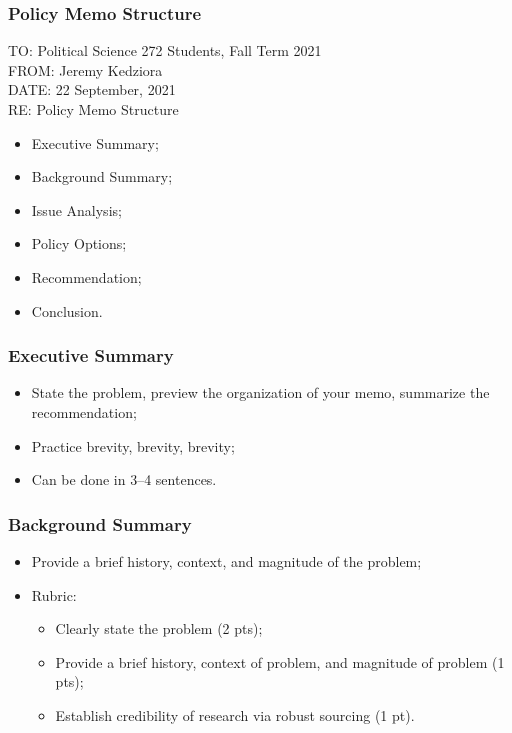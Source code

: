 \documentclass[aspectratio=169]{beamer}
\theoremstyle{principle}
\begin{document}
\begin{frame}
\frametitle{Policy Memo Structure}

TO: Political Science 272 Students, Fall Term 2021\\
FROM: Jeremy Kedziora\\
DATE: 22 September, 2021\\
RE: Policy Memo Structure\\
\begin{itemize}

\item Executive Summary;
\bigskip
\item Background Summary;
\bigskip
\item Issue Analysis;
\bigskip
\item Policy Options;
\bigskip
\item Recommendation;
\bigskip
\item Conclusion.

\end{itemize}

\end{frame}

\begin{frame}
\frametitle{Executive Summary}

\begin{itemize}

\item State the problem, preview the organization of your memo, summarize the recommendation;
\bigskip
\bigskip
\bigskip
\item Practice brevity, brevity, brevity;
\bigskip
\bigskip
\bigskip
\item Can be done in 3--4 sentences.

\end{itemize}

\end{frame}

\begin{frame}
\frametitle{Background Summary}

\begin{itemize}

\item Provide a brief history, context, and magnitude of the problem; 
\bigskip
\bigskip
\bigskip
\item Rubric:
\begin{itemize}
\item Clearly state the problem (2 pts);
\item Provide a brief history, context of problem, and magnitude of problem (1 pts);
\item Establish credibility of research via robust sourcing (1 pt).
\end{itemize}
\end{itemize}

\end{frame}
\end{document}
